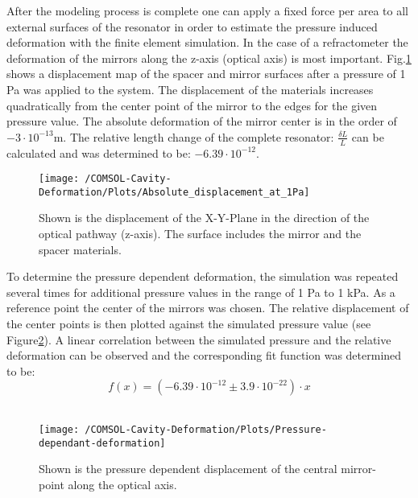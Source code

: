 \newpage
\noindent
After the modeling process is complete one can apply a fixed force per area to all external surfaces of the resonator in order to estimate the pressure induced deformation with the finite element simulation. In the case of a refractometer the deformation of the mirrors along the z-axis (optical axis) is most important.  Fig.\ref{fig:Displacement-map} shows a displacement map of the spacer and mirror surfaces after a pressure of 1 Pa was applied to the system. The displacement of the materials increases quadratically from the center point of the mirror to the edges for the given pressure value. The absolute deformation of the mirror center is in the order of $-3 \cdot 10^{-13}$m. The relative length change of the complete resonator: $\frac{\delta L}{L} $ can be calculated and was determined to be: $-6.39 \cdot 10^{-12}$.
\begin{figure}[H]
	\centering
	\texttt{[image: /COMSOL-Cavity-Deformation/Plots/Absolute\_displacement\_at\_1Pa]}
	\caption{Shown is the displacement of the X-Y-Plane in the direction of the optical pathway (z-axis). The surface includes the mirror and the spacer materials.}
	\label{fig:Displacement-map}
\end{figure}
\noindent
To determine the pressure dependent deformation, the simulation was repeated several times for additional pressure values in the range of 1 Pa to 1 kPa. As a reference point the center of the mirrors was chosen. The relative displacement of the center points is then plotted against the simulated pressure value (see Figure\ref{fig5a}). A linear correlation between the simulated pressure and the relative deformation can be observed and the corresponding fit function was determined to be:
\begin{equation}
	f(x)= (-6.39\cdot 10^{-12} \pm 3.9\cdot 10^{-22})\cdot x
\end{equation}\\ 
\newpage
\noindent
\begin{figure}[ht]
	\centering
	\texttt{[image: /COMSOL-Cavity-Deformation/Plots/Pressure-dependant-deformation]}
	\caption{Shown is the pressure dependent displacement of the central mirror-point along the optical axis.}
	\label{fig5a}
\end{figure}
\newpage
\noindent

